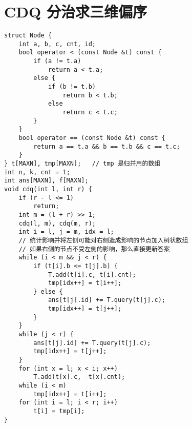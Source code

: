 \section{CDQ 分治求三维偏序}
\begin{verbatim}
struct Node {
    int a, b, c, cnt, id;
    bool operator < (const Node &t) const {
        if (a != t.a)
            return a < t.a;
        else {
            if (b != t.b)
                return b < t.b;
            else
                return c < t.c;
        }
    }
    bool operator == (const Node &t) const {
        return a == t.a && b == t.b && c == t.c;
    } 
} t[MAXN], tmp[MAXN];   // tmp 是归并用的数组
int n, k, cnt = 1;
int ans[MAXN], f[MAXN];
void cdq(int l, int r) {
    if (r - l <= 1)
        return;
    int m = (l + r) >> 1;
    cdq(l, m), cdq(m, r);
    int i = l, j = m, idx = l;
    // 统计影响并将左侧可能对右侧造成影响的节点加入树状数组
    // 如果右侧的节点不受左侧的影响，那么直接更新答案
    while (i < m && j < r) {
        if (t[i].b <= t[j].b) {
            T.add(t[i].c, t[i].cnt);
            tmp[idx++] = t[i++];
        } else {
            ans[t[j].id] += T.query(t[j].c);
            tmp[idx++] = t[j++];
        }
    }
    while (j < r) {
        ans[t[j].id] += T.query(t[j].c);
        tmp[idx++] = t[j++];
    }
    for (int x = l; x < i; x++)
        T.add(t[x].c, -t[x].cnt); 
    while (i < m)
        tmp[idx++] = t[i++];
    for (int i = l; i < r; i++)
        t[i] = tmp[i];
}
\end{verbatim}